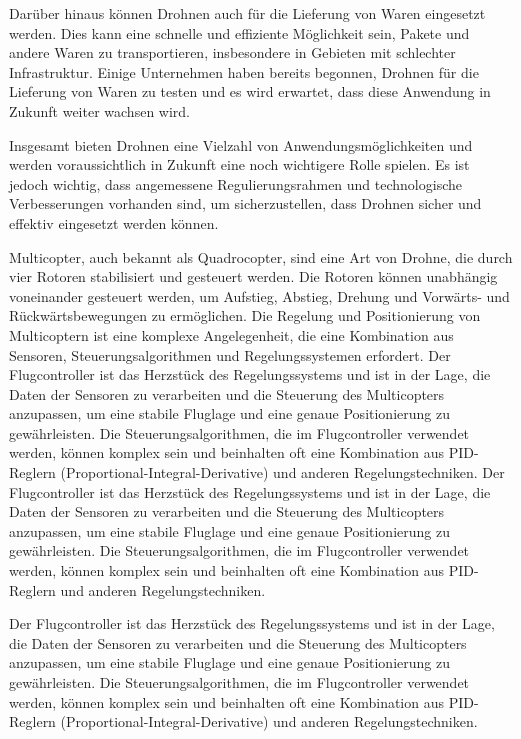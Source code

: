 Darüber hinaus können Drohnen auch für die Lieferung von Waren eingesetzt werden. Dies kann eine schnelle und effiziente Möglichkeit sein, Pakete und andere Waren zu transportieren, insbesondere in Gebieten mit schlechter Infrastruktur. Einige Unternehmen haben bereits begonnen, Drohnen für die Lieferung von Waren zu testen und es wird erwartet, dass diese Anwendung in Zukunft weiter wachsen wird.

Insgesamt bieten Drohnen eine Vielzahl von Anwendungsmöglichkeiten und werden voraussichtlich in Zukunft eine noch wichtigere Rolle spielen. Es ist jedoch wichtig, dass angemessene Regulierungsrahmen und technologische Verbesserungen vorhanden sind, um sicherzustellen, dass Drohnen sicher und effektiv eingesetzt werden können.

Multicopter, auch bekannt als Quadrocopter, sind eine Art von Drohne, die durch vier Rotoren stabilisiert und gesteuert werden. Die Rotoren können unabhängig voneinander gesteuert werden, um Aufstieg, Abstieg, Drehung und Vorwärts- und Rückwärtsbewegungen zu ermöglichen. Die Regelung und Positionierung von Multicoptern ist eine komplexe Angelegenheit, die eine Kombination aus Sensoren, Steuerungsalgorithmen und Regelungssystemen erfordert. 
Der Flugcontroller ist das Herzstück des Regelungssystems und ist in der Lage, die Daten der Sensoren zu verarbeiten und die Steuerung des Multicopters anzupassen, um eine stabile Fluglage und eine genaue Positionierung zu gewährleisten. Die Steuerungsalgorithmen, die im Flugcontroller verwendet werden, können komplex sein und beinhalten oft eine Kombination aus PID-Reglern (Proportional-Integral-Derivative) und anderen Regelungstechniken.
Der Flugcontroller ist das Herzstück des Regelungssystems und ist in der Lage, die Daten der Sensoren zu verarbeiten und die Steuerung des Multicopters anzupassen, um eine stabile Fluglage und eine genaue Positionierung zu gewährleisten. Die Steuerungsalgorithmen, die im Flugcontroller verwendet werden, können komplex sein und beinhalten oft eine Kombination aus \ac{PID}-Reglern und anderen Regelungstechniken.

Der Flugcontroller ist das Herzstück des Regelungssystems und ist in der Lage, die Daten der Sensoren zu verarbeiten und die Steuerung des Multicopters anzupassen, um eine stabile Fluglage und eine genaue Positionierung zu gewährleisten. Die Steuerungsalgorithmen, die im Flugcontroller verwendet werden, können komplex sein und beinhalten oft eine Kombination aus PID-Reglern (Proportional-Integral-Derivative) und anderen Regelungstechniken.


